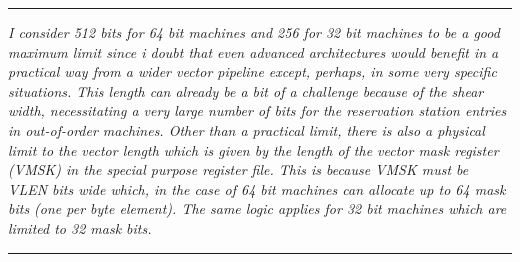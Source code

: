     \par\noindent\rule{\textwidth}{0.4pt}
    \textit{I consider 512 bits for 64 bit machines and 256 for 32 bit machines to be a good maximum limit since i doubt that even advanced architectures would benefit in a practical way from a wider vector pipeline except, perhaps, in some very specific situations. This length can already be a bit of a challenge because of the shear width, necessitating a very large number of bits for the reservation station entries in out-of-order machines. Other than a practical limit, there is also a physical limit to the vector length which is given by the length of the vector mask register (VMSK) in the special purpose register file. This is because VMSK must be VLEN bits wide which, in the case of 64 bit machines can allocate up to 64 mask bits (one per byte element). The same logic applies for 32 bit machines which are limited to 32 mask bits.}
    \par\noindent\rule{\textwidth}{0.4pt}